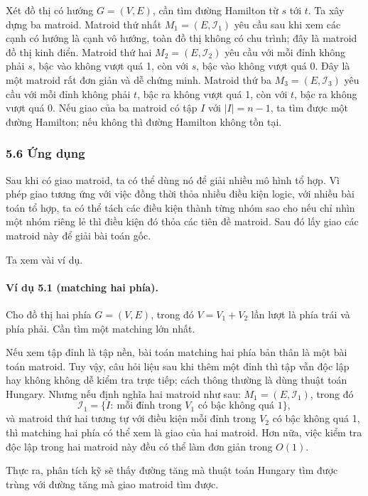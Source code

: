 \documentclass[11pt]{article}
\begin{document}
Xét đồ thị có hướng \(G=(V,E)\), cần tìm đường Hamilton từ \(s\) tới \(t\). Ta
xây dựng ba matroid. Matroid thứ nhất \(M_1=(E,\mathcal I_1)\) yêu cầu sau khi
xem các cạnh có hướng là cạnh vô hướng, toàn đồ thị không có chu trình; đây là
matroid đồ thị kinh điển. Matroid thứ hai \(M_2=(E,\mathcal I_2)\) yêu cầu với
mỗi đỉnh không phải \(s\), bậc vào không vượt quá 1, còn với \(s\), bậc vào
không vượt quá 0. Đây là một matroid rất đơn giản và dễ chứng minh. Matroid thứ
ba \(M_3=(E,\mathcal I_3)\) yêu cầu với mỗi đỉnh không phải \(t\), bậc ra không
vượt quá 1, còn với \(t\), bậc ra không vượt quá 0. Nếu giao của ba matroid có
tập \(I\) với \(|I|=n-1\), ta tìm được một đường Hamilton; nếu không thì đường
Hamilton không tồn tại.

\subsubsection*{5.6 Ứng dụng}

Sau khi có giao matroid, ta có thể dùng nó để giải nhiều mô hình tổ hợp. Vì phép
giao tương ứng với việc đồng thời thỏa nhiều điều kiện logic, với nhiều bài toán
tổ hợp, ta có thể tách các điều kiện thành từng nhóm sao cho nếu chỉ nhìn một
nhóm riêng lẻ thì điều kiện đó thỏa các tiên đề matroid. Sau đó lấy giao các
matroid này để giải bài toán gốc.

Ta xem vài ví dụ.

\paragraph{Ví dụ 5.1 (matching hai phía).}
Cho đồ thị hai phía \(G=(V,E)\), trong đó \(V=V_1+V_2\) lần lượt là phía trái và
phía phải. Cần tìm một matching lớn nhất.

Nếu xem tập đỉnh là tập nền, bài toán matching hai phía bản thân là một bài toán
matroid. Tuy vậy, câu hỏi liệu sau khi thêm một đỉnh thì tập vẫn độc lập hay
không không dễ kiểm tra trực tiếp; cách thông thường là dùng thuật toán Hungary.
Nhưng nếu định nghĩa hai matroid như sau: \(M_1=(E,\mathcal I_1)\), trong đó
\[
  \mathcal I_1=\{I:\ \text{mỗi đỉnh trong }V_1\text{ có bậc không quá }1\},
\]
và matroid thứ hai tương tự với điều kiện mỗi đỉnh trong \(V_2\) có bậc không
quá 1, thì matching hai phía có thể xem là giao của hai matroid. Hơn nữa, việc
kiểm tra độc lập trong hai matroid này đều có thể làm đơn giản trong \(O(1)\).

Thực ra, phân tích kỹ sẽ thấy đường tăng mà thuật toán Hungary tìm được trùng
với đường tăng mà giao matroid tìm được.
\end{document}
